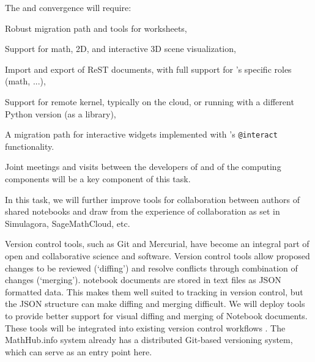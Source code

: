 \begin{workpackage}
\begin{tasklist}
\begin{task}[title=Uniform notebook interface for all interactive
  components,id=ipython-kernels,lead=PS, partners={SR,UK,USH,USO,LL,SA,UV},
  PM=24, wphases=0-36]
  The \Sage and \Jupyter convergence  will
  require:
  \begin{compactitem}
  \item Robust migration path and tools for \Sage worksheets,
  \item Support for math, 2D, and interactive 3D scene visualization,
  \item Import and export of ReST documents, with full support for
    \Sage's specific roles (math, ...),
  \item Support for remote \Sage kernel, typically on the cloud, or
    running with a different Python version (\Sage as a library),
  \item A migration path for interactive widgets implemented with
    \Sage's \texttt{@interact} functionality.
  \end{compactitem}

  Joint meetings and visits between the developers of \Jupyter and of
  the computing components will be a key component of this task.

\end{task}

\begin{task}[id=notebook-collab,title=Notebook improvements for collaboration,lead=SR, partners={PS,USH,JU,USO,LL}, PM=20, wphases=0-24]

  In this task, we will further improve tools for collaboration
  between authors of shared \Jupyter notebooks and draw from the
  experience of collaboration as set in Simulagora, SageMathCloud,
  etc.

  Version control tools, such as Git and Mercurial, have become an
  integral part of open and collaborative science and
  software. Version control tools allow proposed changes to be
  reviewed (`diffing') and resolve conflicts through combination of
  changes (`merging'). \Jupyter notebook documents are stored in text
  files as JSON formatted data. This makes them well suited to
  tracking in version control, but the JSON structure can make diffing
  and merging difficult. We will deploy tools to provide better
  support for visual diffing and merging of Notebook documents. These
  tools will be integrated into existing version control workflows
  . The MathHub.info system already has
  a distributed Git-based versioning system, which can serve as an
  entry point here.


\end{task}
\end{tasklist}
\end{workpackage}
